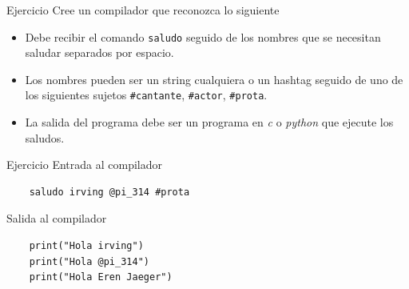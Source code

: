 \documentclass{beamer}
\begin{document}
		\begin{frame}{Ejercicio}
		Cree un compilador que reconozca lo siguiente
		\begin{itemize}
			\item Debe recibir el comando \texttt{saludo} seguido de los nombres que se necesitan saludar separados por espacio.
			\item Los nombres pueden ser un string cualquiera o un hashtag seguido de uno de los siguientes sujetos \texttt{\#cantante}, \texttt{\#actor}, \texttt{\#prota}.
			\item La salida del programa debe ser un programa en \textit{c} o \textit{python} que ejecute los saludos.
		\end{itemize}
		
	\end{frame}
	
		\begin{frame}[fragile]{Ejercicio}
			Entrada al compilador
		\begin{verbatim}
	saludo irving @pi_314 #prota
\end{verbatim}
Salida al compilador
		\begin{verbatim}
	print("Hola irving")
	print("Hola @pi_314")
	print("Hola Eren Jaeger")
\end{verbatim}
		
	\end{frame}
	
\end{document}
